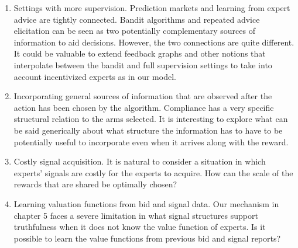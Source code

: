 \begin{enumerate}

\item Settings with more supervision. Prediction markets and learning from expert advice are tightly connected. Bandit algorithms and repeated advice elicitation can be seen as two potentially complementary sources of information to aid decisions. However, the two connections are quite different. It could be valuable to extend feedback graphs and other notions that interpolate between the bandit and full supervision settings to take into account incentivized experts as in our model. 

\item Incorporating general sources of information that are observed after the action has been chosen by the algorithm. Compliance has a very specific structural relation to the arms selected. It is interesting to explore what can be said generically about what structure the information has to have to be potentially useful to incorporate even when it arrives along with the reward.

\item Costly signal acquisition. It is natural to consider a situation in which experts' signals are costly for the experts to acquire. How can the scale of the rewards that are shared be optimally chosen?

\item Learning valuation functions from bid and signal data. Our mechanism in chapter 5 faces a severe limitation in what signal structures support truthfulness when it does not know the value function of experts. Is it possible to learn the value functions from previous bid and signal reports?

\end{enumerate}





